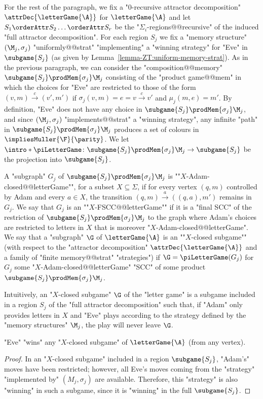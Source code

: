 \documentclass[10pt,a4paper]{amsart}
\renewcommand{\ss}{\sigma}
\renewcommand{\SS}{\Sigma}
\newcommand{\re}[1]{\xrightarrow{#1}}
\begin{document}
For the rest of the paragraph, we fix a "$0$-recursive attractor decomposition" $\attrDec{\letterGame{\A}}$ for $\letterGame{\A}$ and let $S_1 \orderAttr S_2 \dots \orderAttr S_r$ be the "$\SS_i$-regions@@recursive" of the induced "full attractor decomposition".
For each region $S_j$ we fix a "memory structure" $(\M_j, \ss_j)$ "uniformly@@strat" "implementing" a "winning strategy" for "Eve" in $\subgame{S_j}$  (as given by Lemma~\ref{lemma-ZT:uniform-memory-strat}).
As in the previous paragraph, we can consider the "composition@@memory" $\subgame{S_j} \prodMem{\ss_j} \M_j$ consisting of the "product game@@mem" in which the choices for "Eve" are restricted to those of the form 
$(v,m) \re{c} (v',m')$ if  $\ss_j(v,m) =  e = v\re{c} v'$ and $\mu_j(m,e) = m'$. 
By definition, "Eve" does not have any choice in $\subgame{S_j} \prodMem{\ss_j} \M_j$, and since $(\M_j, \ss_j)$ "implements@@strat" a "winning strategy", any infinite "path" in $\subgame{S_j} \prodMem{\ss_j} \M_j$ produces a set of colours in $\impliesMuller{\F}{\parity}$.
\AP We let $\intro*\piLetterGame\colon \subgame{S_j} \prodMem{\ss_j} \M_j \to \subgame{S_j}$ be the projection into $\subgame{S_j}$.


\AP A "subgraph" $G_j$ of $\subgame{S_j} \prodMem{\ss_j} \M_j$ is ""$X$-Adam-closed@@letterGame"", for a subset $X\subseteq \SS$, if for every vertex $(q,m)$ controlled by Adam and every $a\in X$, the transition $(q,m)\re{a} ((q,a),m')$ remains in $G_j$. %
We say that $G_j$ is an ""$X$-FSCC@@letterGame"" if it is a "final SCC" of the restriction of $\subgame{S_j} \prodMem{\ss_j} \M_j$ to the graph where Adam's choices are restricted to letters in $X$ that is moreover "$X$-Adam-closed@@letterGame". 
\AP We say that a "subgraph" $\G$ of $\letterGame{\A}$ is an ""$X$-closed subgame"" (with respect to the "attractor decomposition" $\attrDec{\letterGame{\A}}$ and a family of "finite memory@@strat" "strategies")  if $\G = \piLetterGame(G_j)$ for $G_j$ some "$X$-Adam-closed@@letterGame" "SCC" of some product $\subgame{S_j} \prodMem{\ss_j} \M_j$.

Intuitively, an "$X$-closed subgame" $\G$ of the "letter game" is a subgame included in a region $S_j$ of the "full attractor decomposition"  such that, if "Adam" only provides letters in $X$ and "Eve" plays according to the strategy defined by the "memory structures" $\M_j$, the play will never leave $\G$. 

\begin{lemma}\label{lemma-ZT:Eve-wins-closed-subgames}
	"Eve" "wins" any "$X$-closed subgame" of $\letterGame{\A}$ (from any vertex).
\end{lemma}
\begin{proof}
	In an "$X$-closed subgame" included in a region $\subgame{S_j}$, "Adam's" moves have been restricted; however, all Eve's moves coming from the "strategy" "implemented by" $(M_j, \ss_j)$ are available. Therefore, this "strategy" is also "winning" in such a subgame, since it is "winning" in the full $\subgame{S_j}$.
\end{proof}
\end{document}
